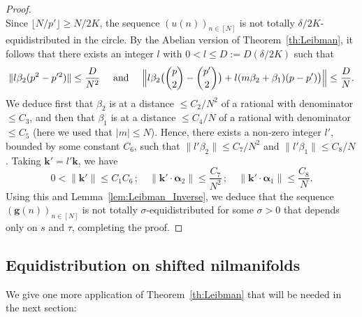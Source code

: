 \documentclass[11pt]{amsart}
\theoremstyle{definition}
\begin{document}
\begin{proof}
$$$$
Since $\lfloor N/p'\rfloor \geq  N/2K$,  the sequence
$(u(n))_{n\in[N]}$ is not totally $\delta/2K$-equidistributed in the
circle. By the Abelian version of Theorem~\ref{th:Leibman}, it
follows that there exists an integer $l$ with $0< l\leq
D:=D(\delta/2K)$ such that
$$
{\lVert { l\beta_2(p^2-p'^2)} \rVert}\leq \frac D{N^2} \quad \text{ and } \quad
\Bigl\Vert l\beta_2\bigl(\binom
p2-\binom{p'}2\bigr)+l(m\beta_2+\beta_1)(p-p')\bigr)\Bigr\Vert\leq\frac
DN.
$$
We deduce first that $\beta_2$ is at a distance $\leq C_2/N^2$ of a
rational with  denominator $\leq C_3$, and then that $\beta_1$ is at
a distance $\leq C_4/N$ of a rational with  denominator $\leq C_5$
(here we used that $|m|\leq N$). Hence,  there exists a non-zero
integer $l'$, bounded by some constant $C_6$, such that
${\lVert {l'\beta_2} \rVert}\leq C_7/N^2$ and ${\lVert {l'\beta_1} \rVert}\leq C_8/N$.
Taking ${{\mathbf{k}}}'=l'{{\mathbf{k}}}$, we have
$$
0<{\lVert {{{\mathbf{k}}}'} \rVert}\leq C_1C_6\, ; \quad  {\lVert {{{\mathbf{k}}}'\cdot{{\boldsymbol{\alpha}}}_2} \rVert}\leq
\frac{C_7}{N^2}\, ; \quad {\lVert {{{\mathbf{k}}}'\cdot{{\boldsymbol{\alpha}}}_1} \rVert}\leq
\frac{C_8}{N}.
$$
 Using this and
Lemma~\ref{lem:Leibman_Inverse}, we deduce that the sequence
$({{\mathbf{g}}}(n))_{n\in[N]}$ is not totally $\sigma$-equidistributed for
some $\sigma>0$ that depends only on $s$ and  $\tau$, completing the
proof.
\end{proof}

\subsection{Equidistribution on shifted nilmanifolds}
We give one more application of Theorem~\ref{th:Leibman} that
will be needed in the next section:
\end{document}
